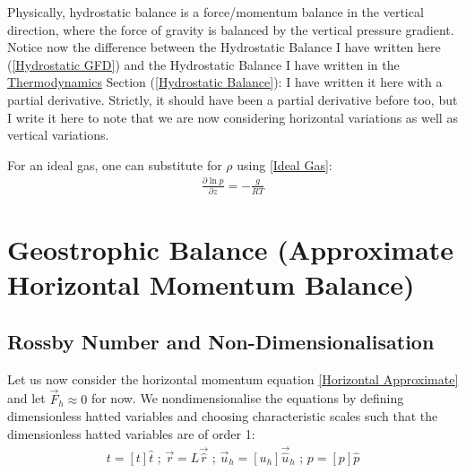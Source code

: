 Physically, hydrostatic balance is a force/momentum balance in the vertical direction, where the force of gravity is balanced by the vertical pressure gradient. Notice now the difference between the Hydrostatic Balance I have written here (\ref{Hydrostatic GFD}) and the Hydrostatic Balance I have written in the \hyperref[Thermodynamics]{Thermodynamics} Section (\ref{Hydrostatic Balance}): I have written it here with a partial derivative. Strictly, it should have been a partial derivative before too, but I write it here to note that we are now considering horizontal variations as well as vertical variations.

For an ideal gas, one can substitute for $\rho$ using \ref{Ideal Gas}:
\begin{align}\label{Hydrostatic Ideal Gas}
    \boxed{\frac{\partial \ln p}{\partial z}=-\frac{g}{RT}}
\end{align}

\section{Geostrophic Balance (Approximate Horizontal Momentum Balance)}\label{App Horiz Bal}

\subsection{Rossby Number and Non-Dimensionalisation}

Let us now consider the horizontal momentum equation \ref{Horizontal Approximate} and let $\vec{F}_h\approx 0$ for now. We nondimensionalise the equations by defining dimensionless hatted variables and choosing characteristic scales such that the dimensionless hatted variables are of order 1:
\begin{align*}
    t=[t]\hat{t}\text{   ;   }
    \vec{r}=L\vec{\hat{r}}\text{   ;   }
    \vec{u}_h=[u_h]\vec{\hat{u}}_h\text{   ;   }
    p=[p]\hat{p}
\end{align*}

